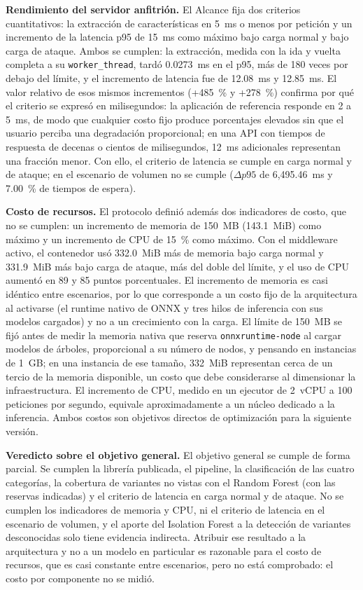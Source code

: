 \textbf{Rendimiento del servidor anfitrión.} El Alcance fija dos criterios cuantitativos: la
extracción de características en 5~ms o menos por petición y un incremento de la latencia p95 de
15~ms como máximo bajo carga normal y bajo carga de ataque. Ambos se cumplen: la extracción,
medida con la ida y vuelta completa a su \texttt{worker\_thread}, tardó 0.0273~ms en el p95, más
de 180 veces por debajo del límite, y el incremento de latencia fue de
12.08~ms y 12.85~ms. El valor relativo de esos mismos incrementos (+485~\% y +278~\%) confirma por
qué el criterio se expresó en milisegundos: la aplicación de referencia responde en 2 a 5~ms, de
modo que cualquier costo fijo produce porcentajes elevados sin que el usuario perciba una
degradación proporcional; en una API con tiempos de respuesta de decenas o cientos de
milisegundos, 12~ms adicionales representan una fracción menor. Con ello, el criterio de latencia se cumple en carga normal y de ataque; en el escenario de
volumen no se cumple (\(\Delta p95\) de 6{,}495.46~ms y 7.00~\% de tiempos de espera).

\textbf{Costo de recursos.} El protocolo definió además dos indicadores de costo, que no se
cumplen: un incremento de memoria de 150~MB (143.1~MiB) como máximo y un incremento de CPU de
15~\% como máximo. Con el middleware activo, el contenedor usó 332.0~MiB más de memoria bajo carga
normal y 331.9~MiB más bajo carga de ataque, más del doble del límite, y el uso de CPU aumentó en
89 y 85 puntos porcentuales. El incremento de memoria es casi idéntico entre escenarios, por lo
que corresponde a un costo fijo de la arquitectura al activarse (el runtime nativo de ONNX y tres
hilos de inferencia con sus modelos cargados) y no a un crecimiento con la carga. El límite de
150~MB se fijó antes de medir la memoria nativa que reserva \texttt{onnxruntime-node} al cargar
modelos de árboles, proporcional a su número de nodos, y pensando en instancias de 1~GB; en una
instancia de ese tamaño, 332~MiB representan cerca de un tercio de la memoria disponible, un costo
que debe considerarse al dimensionar la infraestructura. El incremento de CPU, medido en un
ejecutor de 2~vCPU a 100 peticiones por segundo, equivale aproximadamente a un núcleo dedicado a
la inferencia. Ambos costos son objetivos directos de optimización para la siguiente versión.

\textbf{Veredicto sobre el objetivo general.} El objetivo general se cumple de forma parcial. Se
cumplen la librería publicada, el pipeline, la clasificación de las cuatro categorías, la cobertura
de variantes no vistas con el Random Forest (con las reservas indicadas) y el criterio de latencia
en carga normal y de ataque. No se cumplen los indicadores de memoria y CPU, ni el criterio de
latencia en el escenario de volumen, y el aporte del Isolation Forest a la detección de variantes
desconocidas solo tiene evidencia indirecta. Atribuir ese resultado a la arquitectura y no a un
modelo en particular es razonable para el costo de recursos, que es casi constante entre
escenarios, pero no está comprobado: el costo por componente no se midió.

